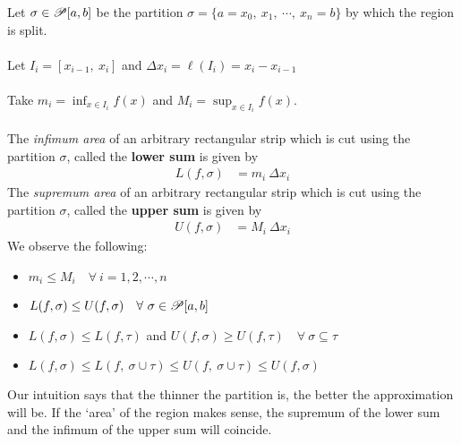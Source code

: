 \documentclass[a4paper]{book}
\begin{document}
\noindent Let $\sigma \in \mathscr{P}[a,b]$ be the partition $\sigma = \lbrace a = x_0,\ x_1,\ \cdots,\ x_n = b \rbrace$ by which the region is split. \\ \\
Let $I_i = [x_{i-1},\ x_i]$ and $\Delta x_i = \ell (I_i) = x_i - x_{i-1}$ \\\\
Take $\displaystyle m_i = \inf_{\displaystyle x \in I_i} f(x)$ and $\displaystyle M_i = \sup_{\displaystyle x \in I_i} f(x)$. \\ \\
The {\em infimum area} of an arbitrary rectangular strip which is cut using the partition $\sigma$, called the {\bf lower sum} is given by 
\begin{align*}
L(f, \sigma) &= m_i\ \Delta x_i 
\end{align*}
The {\em supremum area} of an arbitrary rectangular strip which is cut using the partition $\sigma$, called the {\bf upper sum} is given by 
\begin{align*}
U(f, \sigma) &= M_i\ \Delta x_i 
\end{align*}
We observe the following: 
\begin{itemize}
\item $m_i \leq M_i\quad \forall\ i = 1,2, \cdots, n$
\item $L(f, \sigma) \leq U(f, \sigma)\quad \forall\ \sigma \in \mathscr{P}[a,b]$
\item $L(f, \sigma) \leq L(f, \tau)$ and $U(f, \sigma) \geq U(f, \tau)\quad \forall\ \sigma \subseteq \tau$
\item $L(f, \sigma) \leq L(f,\ \sigma \cup \tau) \leq U(f,\ \sigma \cup \tau) \leq U(f, \sigma)$ \\ 
\end{itemize}
Our intuition says that the thinner the partition is, the better the approximation will be. If the `area' of the region makes sense, the supremum of the lower sum and the infimum of the upper sum will coincide.
\begin{figure}[h]
\centering
{}
\end{figure} \\
\end{document}
